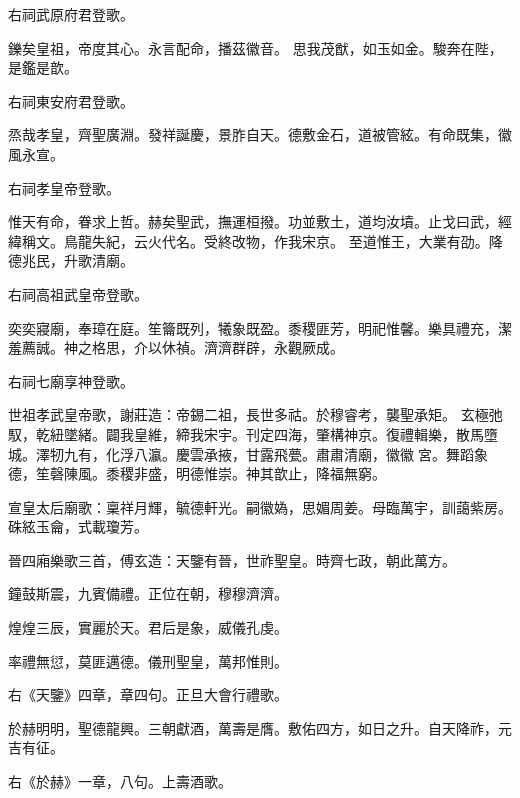 \begin{pinyinscope}
 右祠武原府君登歌。



 鑠矣皇祖，帝度其心。永言配命，播茲徽音。
 思我茂猷，如玉如金。駿奔在陛，是鑑是歆。



 右祠東安府君登歌。



 烝哉孝皇，齊聖廣淵。發祥誕慶，景胙自天。德敷金石，道被管絃。有命既集，徽風永宣。



 右祠孝皇帝登歌。



 惟天有命，眷求上哲。赫矣聖武，撫運桓撥。功並敷土，道均汝墳。止戈曰武，經緯稱文。鳥龍失紀，云火代名。受終改物，作我宋京。
 至道惟王，大業有劭。降德兆民，升歌清廟。



 右祠高祖武皇帝登歌。



 奕奕寢廟，奉璋在庭。笙籥既列，犧象既盈。黍稷匪芳，明祀惟馨。樂具禮充，潔羞薦誠。神之格思，介以休禎。濟濟群辟，永觀厥成。


右祠七廟享神登歌。



 世祖孝武皇帝歌，謝莊造：帝錫二祖，長世多祜。於穆睿考，襲聖承矩。
 玄極弛馭，乾紐墜緒。闢我皇維，締我宋宇。刊定四海，肇構神京。復禮輯樂，散馬墮城。澤牣九有，化浮八瀛。慶雲承掖，甘露飛甍。肅肅清廟，徽徽宮。舞蹈象德，笙磬陳風。黍稷非盛，明德惟崇。神其歆止，降福無窮。



 宣皇太后廟歌：稟祥月輝，毓德軒光。嗣徽媯，思媚周姜。母臨萬宇，訓藹紫房。硃絃玉龠，式載瓊芳。


晉四廂樂歌三首，傅玄造：天鑒有晉，世祚聖皇。時齊七政，朝此萬方。


鐘鼓斯震，九賓備禮。正位在朝，穆穆濟濟。


煌煌三辰，實麗於天。君后是象，威儀孔虔。


率禮無愆，莫匪邁德。儀刑聖皇，萬邦惟則。



 右《天鑒》四章，章四句。正旦大會行禮歌。



 於赫明明，聖德龍興。三朝獻酒，萬壽是膺。敷佑四方，如日之升。自天降祚，元吉有征。



 右《於赫》一章，八句。上壽酒歌。



\end{pinyinscope}
